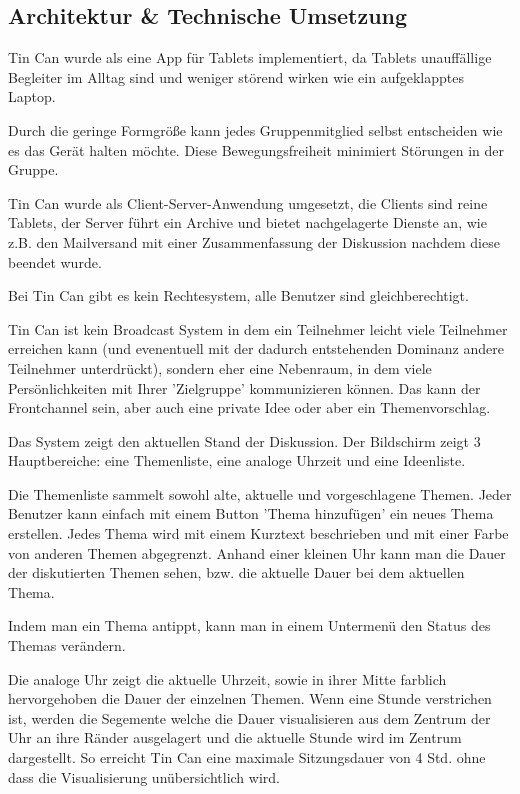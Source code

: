 \subsection{Architektur \& Technische Umsetzung}
Tin Can wurde als eine App für Tablets implementiert, da Tablets unauffällige
Begleiter im Alltag sind und weniger störend wirken wie ein aufgeklapptes
Laptop.

Durch die geringe Formgröße kann jedes Gruppenmitglied selbst entscheiden wie es
das Gerät halten möchte. Diese Bewegungsfreiheit minimiert Störungen in der
Gruppe.

Tin Can wurde als Client-Server-Anwendung umgesetzt, die Clients sind reine
Tablets, der Server führt ein Archive und bietet nachgelagerte Dienste an, wie
z.B. den Mailversand mit einer Zusammenfassung der Diskussion nachdem diese
beendet wurde.

Bei Tin Can gibt es kein Rechtesystem, alle Benutzer sind gleichberechtigt.

Tin Can ist kein Broadcast System in dem ein Teilnehmer leicht viele Teilnehmer
erreichen kann (und evenentuell mit der dadurch entstehenden Dominanz andere
Teilnehmer unterdrückt), sondern eher eine Nebenraum, in dem viele
Persönlichkeiten mit Ihrer 'Zielgruppe' kommunizieren können. Das kann der
Frontchannel sein, aber auch eine private Idee oder aber ein Themenvorschlag.

Das System zeigt den aktuellen Stand der Diskussion. Der Bildschirm zeigt 3
Hauptbereiche: eine Themenliste, eine analoge Uhrzeit und eine Ideenliste.

Die Themenliste sammelt sowohl alte, aktuelle und vorgeschlagene Themen. Jeder
Benutzer kann einfach mit einem Button 'Thema hinzufügen' ein neues Thema
erstellen. Jedes Thema wird mit einem Kurztext beschrieben und mit einer Farbe
von anderen Themen abgegrenzt. Anhand einer kleinen Uhr kann man die Dauer der
diskutierten Themen sehen, bzw. die aktuelle Dauer bei dem aktuellen Thema.

Indem man ein Thema antippt, kann man in einem Untermenü den Status des Themas
verändern.

Die analoge Uhr zeigt die aktuelle Uhrzeit, sowie in ihrer Mitte farblich
hervorgehoben die Dauer der einzelnen Themen.
Wenn eine Stunde verstrichen ist, werden die Segemente welche die Dauer
visualisieren aus dem Zentrum der Uhr an ihre Ränder ausgelagert und die
aktuelle Stunde wird im Zentrum dargestellt. So erreicht Tin Can eine maximale
Sitzungsdauer von 4 Std. ohne dass die Visualisierung unübersichtlich wird.

